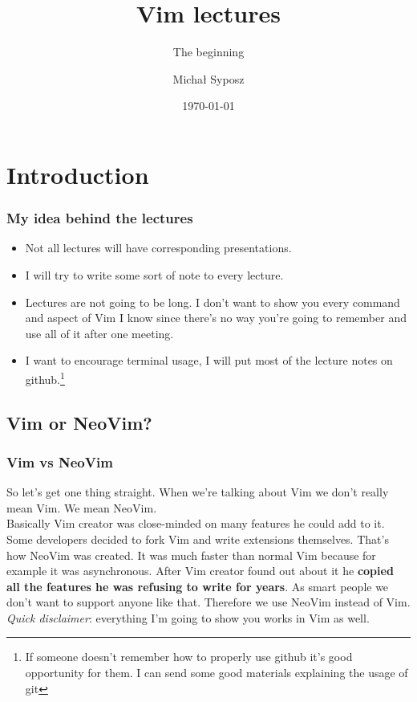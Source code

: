 \documentclass{beamer}
\title{Vim lectures}
\subtitle{The beginning}
\author{Michał Syposz}
\date{\today}
\begin{document}
    \begin{frame}
    \titlepage
    \end{frame}
    \section{Introduction}
    \begin{frame}
    \frametitle{My idea behind the lectures}
    \begin{itemize}
        \item Not all lectures will have corresponding presentations.
        \item I will try to write some sort of note to every lecture.
        \item Lectures are not going to be long. I don't want to show you 
            every command and aspect of Vim I know since there's no way you're going
            to remember and use all of it after one meeting.
        \item I want to encourage terminal usage, I will put most of the lecture notes
            on github.\footnote{If someone doesn't remember how to properly use github 
            it's good opportunity for them. I can send some good materials explaining
            the usage of git}
    \end{itemize}
    \end{frame}
    \subsection{Vim or NeoVim?}
    \begin{frame}
    \frametitle{Vim vs NeoVim}
        So let's get one thing straight. When we're talking about Vim we don't really 
        mean Vim. We mean NeoVim.\\
        Basically Vim creator was close-minded on many features he could add to it.
        Some developers decided to fork Vim and write extensions themselves. That's how
        NeoVim was created. It was much faster than normal Vim because for example
        it was asynchronous. After Vim creator found out about it 
        he \textbf{copied all the features he was refusing to write for years}. As smart 
        people we don't want to support anyone like that. Therefore we use NeoVim instead
        of Vim.\\
        \textit{Quick disclaimer}: everything I'm going to show you works in Vim as well. 
    \end{frame}
\end{document}

